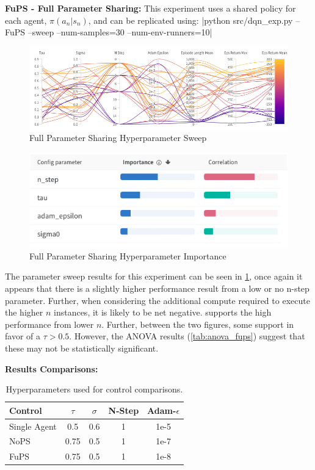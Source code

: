 \documentclass[12pt,letterpaper]{exam}
\begin{document}
\begin{questions}
    \question \textbf{FuPS - Full Parameter Sharing:}
    This experiment uses a shared policy for each agent, 
    \(\pi(a_n|s_n)\), and can be replicated using:
|python src/dqn_exp.py --FuPS --sweep --num-samples=30 --num-env-runners=10|

    \begin{figure}[H]
        \centering
        \includegraphics[width=.95\linewidth]{para_coord_fups.png}
        \caption{Full Parameter Sharing Hyperparameter Sweep}
        \label{fig:fups_para}
    \end{figure}

    \begin{figure}[H]
        \centering
        \includegraphics[width=.5\linewidth]{importance_fups.png}
        \caption{Full Parameter Sharing Hyperparameter Importance}
        \label{fig:fups_importance}
    \end{figure}

    The parameter sweep results for this experiment can be seen in 
    \cref{fig:fups_para}, once again it appears that there is a 
    slightly higher performance result from a low or no n-step parameter.
    Further, when considering the additional compute required to execute
    the higher \(n\) instances, it is likely to be net negative.
     supports the high performance from lower \(n\).
    Further, between the two figures, some support in favor of a \(\tau>0.5\).
    However, the ANOVA results (\cref{tab:anova_fups}) suggest that these
    may not be statistically significant.

\question \textbf{Results Comparisons:}

    \begin{table}[h]
        \centering
        \begin{tabular}{l cccc}
            Control & \(\tau\) & \(\sigma\) & N-Step & Adam-\(\epsilon\) \\
            \midrule
            Single Agent & 0.5 & 0.6 & 1 & 1e-5\\
            NoPS & 0.75 & 0.5 & 1 & 1e-7 \\
            FuPS & 0.75 & 0.5 & 1 & 1e-8 \\
        \end{tabular}
        \caption{Hyperparameters used for control comparisons.}
        \label{tab:comp_parameters}
    \end{table}


\end{questions}
\end{document}

